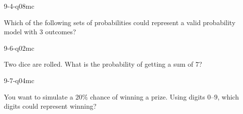 \begin{practiceQuestion}{9-4-q08}{mc}
\begin{questionText}
Which of the following sets of probabilities could represent a valid probability model with $3$ outcomes?
\end{questionText}
\end{practiceQuestion}

\begin{practiceQuestion}{9-6-q02}{mc}
\begin{questionText}
Two dice are rolled. What is the probability of getting a sum of $7$?
\end{questionText}
\end{practiceQuestion}

\begin{practiceQuestion}{9-7-q04}{mc}
\begin{questionText}
You want to simulate a $20\%$ chance of winning a prize. Using digits $0$--$9$, which digits could represent winning?
\end{questionText}
\end{practiceQuestion}

